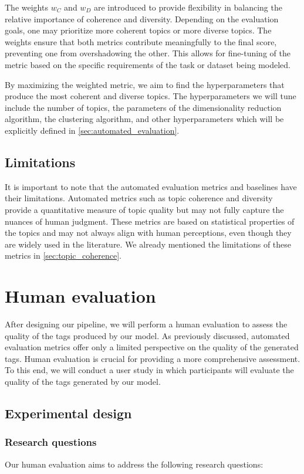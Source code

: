The weights \( w_C \) and \( w_D \) are introduced to provide flexibility in balancing the relative importance of coherence and diversity. Depending on the evaluation goals, one may prioritize more coherent topics or more diverse topics. The weights ensure that both metrics contribute meaningfully to the final score, preventing one from overshadowing the other. This allows for fine-tuning of the metric based on the specific requirements of the task or dataset being modeled.

By maximizing the weighted metric, we aim to find the hyperparameters that produce the most coherent and diverse topics. The hyperparameters we will tune include the number of topics, the parameters of the dimensionality reduction algorithm, the clustering algorithm, and other hyperparameters which will be explicitly defined in \cref{sec:automated_evaluation}.

\subsection{Limitations}
It is important to note that the automated evaluation metrics and baselines have their limitations. Automated metrics such as topic coherence and diversity provide a quantitative measure of topic quality but may not fully capture the nuances of human judgment. These metrics are based on statistical properties of the topics and may not always align with human perceptions, even though they are widely used in the literature. We already mentioned the limitations of these metrics in \cref{sec:topic_coherence}.

\section{Human evaluation}
\label{sec:human_evaluation}
After designing our pipeline, we will perform a human evaluation to assess the quality of the tags produced by our model. As previously discussed, automated evaluation metrics offer only a limited perspective on the quality of the generated tags. Human evaluation is crucial for providing a more comprehensive assessment. To this end, we will conduct a user study in which participants will evaluate the quality of the tags generated by our model.

\subsection{Experimental design}
\subsubsection{Research questions}
Our human evaluation aims to address the following research questions:

